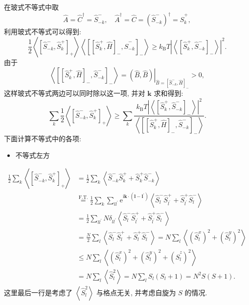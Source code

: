 在玻式不等式中取
\begin{equation}
\hat{A}=\hat{C}^{\dagger}=\hat{S}_{-k}^{-}, \quad \hat{A}^{\dagger}=\hat{C}=\left(\hat{S}_{-k}^{-}\right)^{\dagger}=\hat{S}_{k}^{+},
\end{equation}
利用玻式不等式可以得到:
\begin{equation}
\frac{1}{2}\left\langle\left[\hat{S}_{-k}^{-}, \hat{S}_{k}^{+}\right]_{+}\right\rangle\left\langle\left[\left[\hat{S}_{k}^{+}, \hat{H}\right]_{-}, \hat{S}_{-k}^{-}\right]_{-}\right\rangle \geqslant k_{\mathrm{B}} T\left|\left\langle\left[\hat{S}_{k}^{+}, \hat{S}_{-k}^{-}\right]_{-}\right\rangle\right|^{2} .
\end{equation}
由于
\begin{equation}
\left\langle\left[\left[\hat{S}_{k}^{+}, \hat{H}\right]_{-}, \hat{S}_{-k}^{-}\right]_{-}\right\rangle=\left.(\hat{B}, \hat{B})\right|_{\hat{B}=\left[\hat{S}_{-k}^{-}, \hat{H}\right]_{-}}>0,
\end{equation}
这样玻式不等式两边可以同时除以这一项, 并对 $\boldsymbol{k}$ 求和得到:
\begin{equation}
\sum_{k} \frac{1}{2}\left\langle\left[\hat{S}_{-k}^{-}, \hat{S}_{k}^{+}\right]_{+}\right\rangle \geqslant \sum_{k} \frac{k_{\mathrm{B}} T\left|\left\langle\left[\hat{S}_{k}^{+}, \hat{S}_{-k}^{-}\right]_{-}\right\rangle\right|^{2}}{\left\langle\left[\left[\hat{S}_{k}^{+}, \hat{H}\right]_{-}, \hat{S}_{-k}^{-}\right]_{-}\right\rangle}.
\end{equation}
下面计算不等式中的各项:
\begin{itemize}
\item 不等式左方
\end{itemize}
\begin{align}
\frac{1}{2} \sum_{k}\left\langle\left[\hat{S}_{-k}^{-}, \hat{S}_{k}^{+}\right]_{+}\right\rangle &=\frac{1}{2} \sum_{k}\left\langle\hat{S}_{-k}^{-} \hat{S}_{k}^{+}+\hat{S}_{k}^{+} \hat{S}_{-k}^{-}\right\rangle \nonumber\\
&\stackrel{\text {F.T.}}{=} \frac{1}{2} \sum_{k} \sum_{l l^{\prime}} \mathrm{e}^{\mathrm{i} \boldsymbol{k} \cdot\left(\boldsymbol{l}-\boldsymbol{l}^{\prime}\right)}\left\langle\hat{S}_{l}^{-} \hat{S}_{l^{\prime}}^{+}+\hat{S}_{l^{\prime}}^{+} \hat{S}_{l}^{-}\right\rangle\nonumber\\
&=\frac{1}{2} \sum_{l l^{\prime}} N \delta_{l l^{\prime}}\left\langle\hat{S}_{l}^{-} \hat{S}_{l^{\prime}}^{+}+\hat{S}_{l^{\prime}}^{+} \hat{S}_{l}^{-}\right\rangle \nonumber\\
&=\frac{N}{2} \sum_{l}\left\langle\hat{S}_{l}^{-} \hat{S}_{l}^{+}+\hat{S}_{l}^{+} \hat{S}_{l}^{-}\right\rangle=N \sum_{l}\left\langle\left(\hat{S}_{l}^{x}\right)^{2}+\left(\hat{S}_{l}^{y}\right)^{2}\right\rangle \nonumber\\
& \leqslant N \sum_{l}\left\langle\left(\hat{S}_{l}^{x}\right)^{2}+\left(\hat{S}_{l}^{y}\right)^{2}+\left(\hat{S}_{l}^{z}\right)^{2}\right\rangle \nonumber\\
&=N \sum_{l}\left\langle\hat{S}_{l}^{2}\right\rangle=N \sum_{l} S_{l}\left(S_{l}+1\right)=N^{2} S(S+1).
\end{align}
这里最后一行是考虑了 $\left\langle\hat{S}_{l}^{2}\right\rangle$ 与格点无关, 并考虑自旋为 $S$ 的情况.

